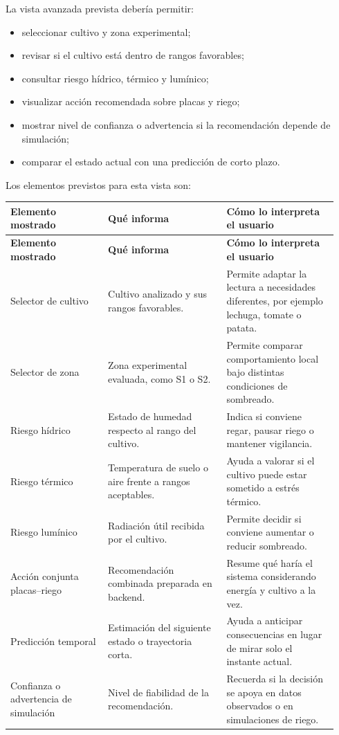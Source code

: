 ﻿\documentclass[11pt,a4paper]{article}
\begin{document}
La vista avanzada prevista debería permitir:

\begin{itemize}
    \item seleccionar cultivo y zona experimental;
    \item revisar si el cultivo está dentro de rangos favorables;
    \item consultar riesgo hídrico, térmico y lumínico;
    \item visualizar acción recomendada sobre placas y riego;
    \item mostrar nivel de confianza o advertencia si la recomendación depende de simulación;
    \item comparar el estado actual con una predicción de corto plazo.
\end{itemize}

Los elementos previstos para esta vista son:

\begin{longtable}{p{0.28\linewidth}p{0.34\linewidth}p{0.32\linewidth}}
\toprule
\textbf{Elemento mostrado} & \textbf{Qué informa} & \textbf{Cómo lo interpreta el usuario} \\
\midrule
\endfirsthead
\toprule
\textbf{Elemento mostrado} & \textbf{Qué informa} & \textbf{Cómo lo interpreta el usuario} \\
\midrule
\endhead
Selector de cultivo & Cultivo analizado y sus rangos favorables. & Permite adaptar la lectura a necesidades diferentes, por ejemplo lechuga, tomate o patata. \\ \addlinespace
Selector de zona & Zona experimental evaluada, como S1 o S2. & Permite comparar comportamiento local bajo distintas condiciones de sombreado. \\ \addlinespace
Riesgo hídrico & Estado de humedad respecto al rango del cultivo. & Indica si conviene regar, pausar riego o mantener vigilancia. \\ \addlinespace
Riesgo térmico & Temperatura de suelo o aire frente a rangos aceptables. & Ayuda a valorar si el cultivo puede estar sometido a estrés térmico. \\ \addlinespace
Riesgo lumínico & Radiación útil recibida por el cultivo. & Permite decidir si conviene aumentar o reducir sombreado. \\ \addlinespace
Acción conjunta placas--riego & Recomendación combinada preparada en backend. & Resume qué haría el sistema considerando energía y cultivo a la vez. \\ \addlinespace
Predicción temporal & Estimación del siguiente estado o trayectoria corta. & Ayuda a anticipar consecuencias en lugar de mirar solo el instante actual. \\ \addlinespace
Confianza o advertencia de simulación & Nivel de fiabilidad de la recomendación. & Recuerda si la decisión se apoya en datos observados o en simulaciones de riego. \\
\bottomrule
\end{longtable}
\end{document}
